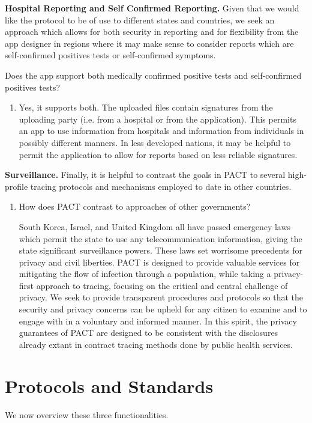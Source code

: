 \documentclass{article}
\begin{document}
\textbf{Hospital Reporting and Self Confirmed Reporting.} 
Given that we would like the protocol to be of use to different states and countries, we seek an approach which allows for both security in reporting and for flexibility from the app designer in regions where it may make sense to  consider reports which are self-confirmed positives tests or self-confirmed symptoms.

Does the app support both medically confirmed positive tests and self-confirmed positives tests?
\begin{enumerate}[leftmargin=*]

\item Yes, it supports both. The uploaded files contain signatures from the uploading party (i.e. from a hospital or from the application). This permits an app to use information from hospitals and information from individuals in possibly different manners. In less developed nations, it may be helpful to permit the application to allow for reports based on less reliable signatures. 

\end{enumerate}

\textbf{Surveillance.} 
Finally, it is helpful to contrast the goals in PACT to several high-profile tracing protocols and mechanisms employed to date in other countries.

\begin{enumerate}[leftmargin=*]
\item How does PACT contrast to approaches of other governments?

South Korea, Israel, and United Kingdom all have passed emergency laws which permit the state to use any telecommunication information, giving the state significant surveillance powers. These laws set worrisome precedents for privacy and civil liberties. PACT is designed to provide valuable services for mitigating the flow of infection through a population, while taking a privacy-first approach to tracing, focusing on the critical and central challenge of privacy. We seek to provide transparent procedures and protocols so that the security and privacy concerns can be upheld for any citizen to examine and to engage with in a voluntary and informed manner.  In this spirit, the privacy guarantees of PACT are designed to be consistent with the disclosures already extant in contract tracing methods done by public health services. 

\end{enumerate}

\section{Protocols and Standards} 
We now overview these three functionalities.
\end{document}
